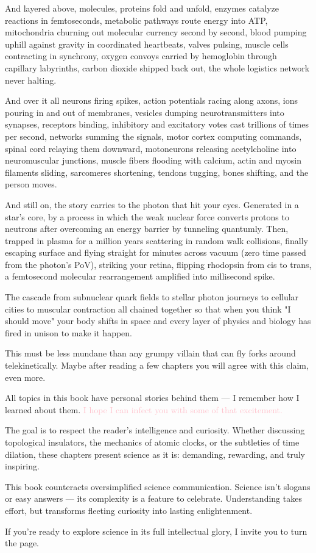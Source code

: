 And layered above, molecules, proteins fold and unfold, enzymes catalyze reactions in femtoseconds, metabolic pathways route energy into ATP, mitochondria churning out molecular currency second by second, blood pumping uphill against gravity in coordinated heartbeats, valves pulsing, muscle cells contracting in synchrony, oxygen convoys carried by hemoglobin through capillary labyrinths, carbon dioxide shipped back out, the whole logistics network never halting.

And over it all neurons firing spikes, action potentials racing along axons, ions pouring in and out of membranes, vesicles dumping neurotransmitters into synapses, receptors binding, inhibitory and excitatory votes cast trillions of times per second, networks summing the signals, motor cortex computing commands, spinal cord relaying them downward, motoneurons releasing acetylcholine into neuromuscular junctions, muscle fibers flooding with calcium, actin and myosin filaments sliding, sarcomeres shortening, tendons tugging, bones shifting, and the person moves.

And still on, the story carries to the photon that hit your eyes. Generated in a star’s core, by a process in which the weak nuclear force converts protons to neutrons after overcoming an energy barrier by tunneling quantumly. Then, trapped in plasma for a million years scattering in random walk collisions, finally escaping surface and flying straight for minutes across vacuum (zero time passed from the photon's PoV), striking your retina, flipping rhodopsin from cis to trans, a femtosecond molecular rearrangement amplified into millisecond spike.

The cascade from subnuclear quark fields to stellar photon journeys to cellular cities to muscular contraction all chained together so that when you think "I should move" your body shifts in space and every layer of physics and biology has fired in unison to make it happen.

This must be less mundane than any grumpy villain that can fly forks around telekinetically. Maybe after reading a few chapters you will agree with this claim, even more.

All topics in this book have personal stories behind them — I remember how I learned about them. \textcolor{pink}{I hope I can infect you with some of that excitement.}

The goal is to respect the reader's intelligence and curiosity. Whether discussing topological insulators, the mechanics of atomic clocks, or the subtleties of time dilation, these chapters present science as it is: demanding, rewarding, and truly inspiring.

This book counteracts oversimplified science communication. Science isn't slogans or easy answers — its complexity is a feature to celebrate. Understanding takes effort, but transforms fleeting curiosity into lasting enlightenment.

If you’re ready to explore science in its full intellectual glory, I invite you to turn the page.

